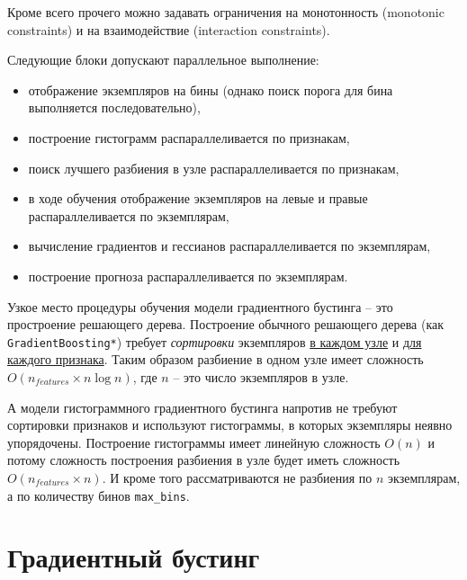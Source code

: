 \documentclass[%
	11pt,
	a4paper,
	utf8,
		]{article}
\begin{document}
Кроме всего прочего можно задавать ограничения на монотонность (monotonic constraints) и на взаимодействие (interaction constraints).

Следующие блоки допускают параллельное выполнение:
\begin{itemize}
	\item отображение экземпляров на бины (однако поиск порога для бина выполняется последовательно),
	
	\item построение гистограмм распараллеливается по признакам,
	
	\item поиск лучшего разбиения в узле распараллеливается по признакам,
	
	\item в ходе обучения отображение экземпляров на левые и правые распараллеливается по экземплярам,
	
	\item вычисление градиентов и гессианов распараллеливается по экземплярам,
	
	\item построение прогноза распараллеливается по экземплярам.
\end{itemize}

Узкое место процедуры обучения модели градиентного бустинга -- это простроение решающего дерева. Построение обычного решающего дерева (как \verb|GradientBoosting*|) {\color{blue}требует \emph{сортировки} экземпляров \underline{в каждом узле} и \underline{для каждого признака}}. Таким образом разбиение в одном узле имеет сложность $ O(n_{features} \times n \log n) $, где $ n $ -- это число экземпляров в узле.

А модели гистограммного градиентного бустинга напротив не требуют сортировки признаков и используют гистограммы, в которых экземпляры неявно упорядочены. Построение гистограммы имеет линейную сложность $ O(n) $ и потому сложность построения разбиения в узле будет иметь сложность $ O(n_{features} \times n) $. И кроме того рассматриваются не разбиения по $ n $ экземплярам, а по количеству бинов \verb|max_bins|.


\section{Градиентный бустинг}
\end{document}
